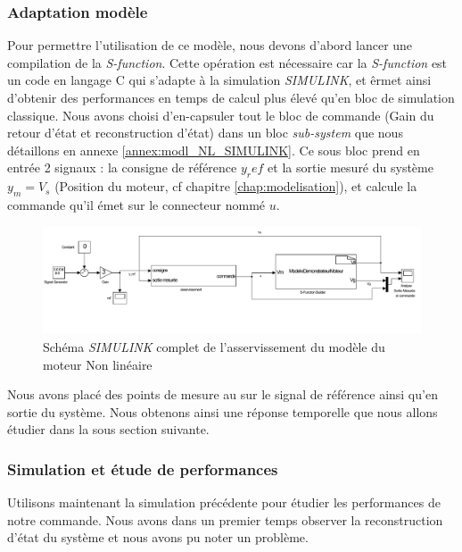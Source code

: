 		\subsubsection{Adaptation modèle}
		Pour permettre l'utilisation de ce modèle, nous devons d'abord lancer une compilation de la \emph{S-function}. Cette opération est nécessaire car la \emph{S-function} est un code en langage C qui s'adapte à la simulation \emph{SIMULINK}, et êrmet ainsi d'obtenir des performances en temps de calcul plus élevé qu'en bloc de simulation classique.
		Nous avons choisi d'en-capsuler tout le bloc de commande (Gain du retour d'état et reconstruction d'état) dans un bloc \emph{sub-system} que nous détaillons en annexe \ref{annex:modl_NL_SIMULINK}. Ce sous bloc prend en entrée 2 signaux : la consigne de référence $y_ref$ et la sortie mesuré du système $y_m = V_s$ (Position du moteur, cf chapitre \ref{chap:modelisation}), et calcule la commande qu'il émet sur le connecteur nommé $u$.\begin{figure}[ht]
		\centering
		\includegraphics[width = \textwidth]{./IV/images/NL_RE_BlocEntier.pdf}
		\caption{Schéma \emph{SIMULINK} complet de l'asservissement du modèle du moteur Non linéaire}\label{fig:SIMULINK_NL_schema}
		\end{figure}
		
		Nous avons placé des points de mesure au sur le signal de référence ainsi qu'en sortie du système. Nous obtenons ainsi une réponse temporelle que nous allons étudier dans la sous section suivante.
		\subsubsection{Simulation et étude de performances}
		Utilisons maintenant la simulation précédente pour étudier les performances de notre commande. Nous avons dans un premier temps observer la reconstruction d'état du système et nous avons pu noter un problème. %
		
			
